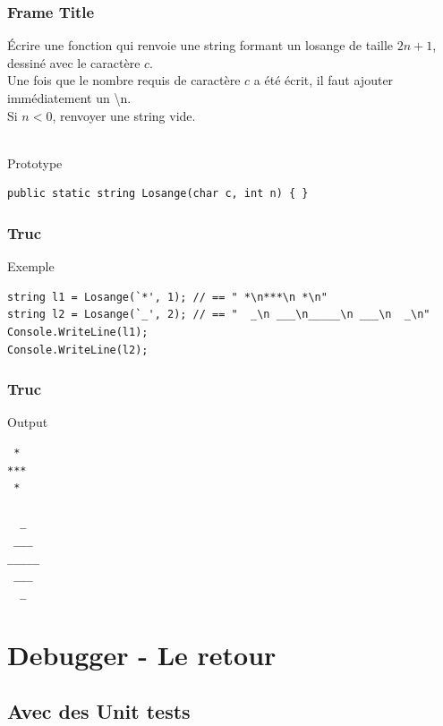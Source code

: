 \documentclass[aspectratio=169]{beamer}
\begin{document}
\begin{frame}[fragile]
\frametitle{Frame Title}
    Écrire une fonction qui renvoie une string formant un losange de taille
    $2n + 1$, dessiné avec le caractère $c$.\\
    Une fois que le nombre requis de caractère $c$ a été écrit, il faut ajouter
    immédiatement un \textbackslash n.\\
    Si $n < 0$, renvoyer une string vide.\\~\

    \begin{infobox}{Prototype}
    \begin{lstlisting}
public static string Losange(char c, int n) { }
    \end{lstlisting}
    \end{infobox}
\end{frame}

\begin{frame}[fragile]
\frametitle{Truc}
    \begin{infobox}{Exemple}
    \begin{lstlisting}
string l1 = Losange(`*', 1); // == " *\n***\n *\n"
string l2 = Losange(`_', 2); // == "  _\n ___\n_____\n ___\n  _\n"
Console.WriteLine(l1);
Console.WriteLine(l2);
    \end{lstlisting}
    \end{infobox}
\end{frame}

\begin{frame}[fragile]
\frametitle{Truc}
    \begin{infobox}{Output}
    \begin{lstlisting}
 * 
***
 * 
 
  _  
 ___ 
_____
 ___
  _
    \end{lstlisting}
    \end{infobox}
\end{frame}

\section{Debugger - Le retour}
\subsection{Avec des Unit tests}
\end{document}
